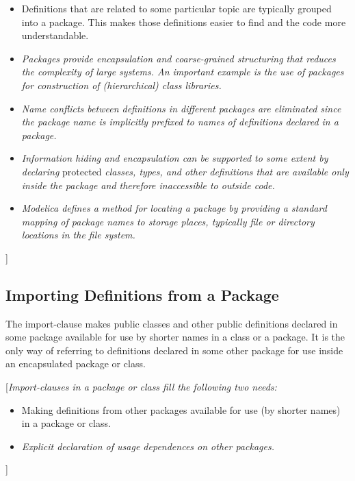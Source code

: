 \documentclass[10pt,a4paper]{report}
\def\doublelabel#1{\label{#1}}
\begin{document}
\begin{itemize}
\item
  Definitions that are related to some particular topic are typically
  grouped into a package. This makes those definitions easier to find
  and the code more understandable.
\item
  \emph{Packages provide encapsulation and coarse-grained structuring
  that reduces the complexity of large systems. An important example is
  the use of packages for construction of (hierarchical) class
  libraries.}
\item
  \emph{Name conflicts between definitions in different packages are
  eliminated since the package name is implicitly prefixed to names of
  definitions declared in a package.}
\item
  \emph{Information hiding and encapsulation can be supported to some
  extent by declaring} protected \emph{classes, types, and other
  definitions that are available only inside the package and therefore
  inaccessible to outside code.}
\item
  \emph{Modelica defines a method for locating a package by providing a
  standard mapping of package names to storage places, typically file or
  directory locations in the file system. }
\end{itemize}

{]}

\subsection{Importing Definitions from a Package}\doublelabel{importing-definitions-from-a-package}

The import-clause makes public classes and other public definitions
declared in some package available for use by shorter names in a class
or a package. It is the only way of referring to definitions declared in
some other package for use inside an encapsulated package or class.

{[}\emph{Import-clauses in a package or class fill the following two
needs:}

\begin{itemize}
\item
  Making definitions from other packages available for use (by shorter
  names) in a package or class.
\item
  \emph{Explicit declaration of usage dependences on other packages.}
\end{itemize}

{]}
\end{document}
